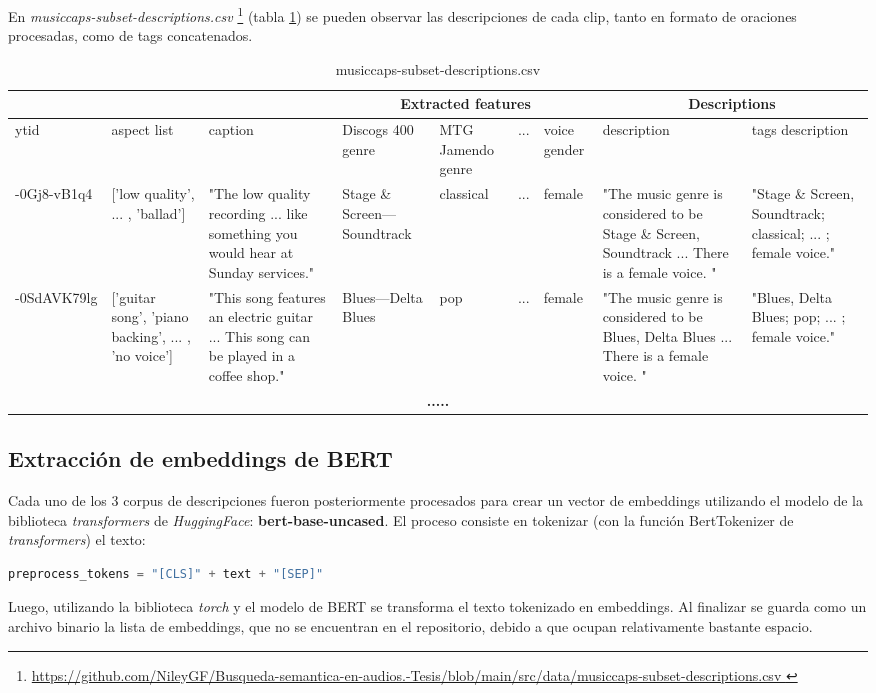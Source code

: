 En \textit{musiccaps-subset-descriptions.csv} \footnote{\href{https://github.com/NileyGF/Busqueda-semantica-en-audios.-Tesis/blob/main/src/data/musiccaps-subset-descriptions.csv} {https://github.com/NileyGF/Busqueda-semantica-en-audios.-Tesis/blob/main/src/data/musiccaps-subset-descriptions.csv } } (tabla \ref{tab:descriptions.csv})  se pueden observar las descripciones de cada clip, tanto en formato de oraciones procesadas, como de tags concatenados. 
\begin{table} [h]
    \tiny
    \centering
    \begin{tabular} { | p{5em} | p{4em} | p{6em} | p{4em} | p{4em} | c | p{4em} | p{6em} | p{6em} |}
    \hline
     \multicolumn{3}{|c|}{ } & \multicolumn{4}{|c|}{Extracted features} & \multicolumn{2}{|c|}{Descriptions} \\
    \hline
        ytid    & aspect list & caption &Discogs 400 genre & MTG Jamendo genre & ... & voice gender & description & tags description \\ 
    \hline
    -0Gj8-vB1q4 &['low quality', ... , 'ballad'] &"The low quality recording ... like something you would hear at Sunday services." & Stage \& Screen---Soundtrack & classical & ... & female &"The music genre is considered to be Stage \& Screen, Soundtrack ... There is a female voice. " &"Stage \& Screen, Soundtrack; classical; ... ; female voice."\\
    \hline
    -0SdAVK79lg &['guitar song', 'piano backing', ... , 'no voice'] &"This song features an electric guitar ... This song can be played in a coffee shop."  & Blues---Delta Blues & pop & ... & female &"The music genre is considered to be Blues, Delta Blues ... There is a female voice. " &"Blues, Delta Blues; pop; ... ; female voice."\\
    \hline
    \multicolumn{9}{|c|}{ \textbf{.....} } \\ 
    \hline
    \end{tabular}
    \caption{musiccaps-subset-descriptions.csv}
    \label{tab:descriptions.csv}
\end{table}

\subsection{Extracción de embeddings de BERT}
\label{subsec:bert-embedd-extr}

Cada uno de los 3 corpus de descripciones fueron posteriormente procesados para crear un vector de embeddings utilizando el modelo de la biblioteca \textit{transformers} de \textit{HuggingFace}: \textbf{bert-base-uncased}. El proceso consiste en tokenizar (con la función BertTokenizer de 
\textit{transformers}) el texto: 
\begin{lstlisting}[language=Python]
preprocess_tokens = "[CLS]" + text + "[SEP]"
\end{lstlisting} 
Luego, utilizando la biblioteca \textit{torch} y el modelo de BERT se transforma el texto tokenizado en embeddings. Al finalizar se guarda como un archivo binario la lista de embeddings, que no se encuentran en el repositorio, debido a que ocupan relativamente bastante espacio.

